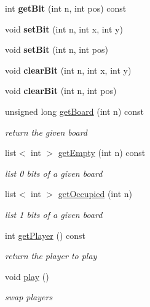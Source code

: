 \begin{DoxyCompactItemize}
\item 
\hypertarget{class_bitboard_a4f966e7856d6ca00e2f3ff9c60b84fa1}{int {\bfseries get\+Bit} (int n, int pos) const }\label{class_bitboard_a4f966e7856d6ca00e2f3ff9c60b84fa1}

\item 
\hypertarget{class_bitboard_ac4e0310c5f4358c6a2324188c331baa6}{void {\bfseries set\+Bit} (int n, int x, int y)}\label{class_bitboard_ac4e0310c5f4358c6a2324188c331baa6}

\item 
\hypertarget{class_bitboard_a719be7dc22698d1d6d9138ac9875328e}{void {\bfseries set\+Bit} (int n, int pos)}\label{class_bitboard_a719be7dc22698d1d6d9138ac9875328e}

\item 
\hypertarget{class_bitboard_a682fc651de10664e2d0c6583609897c1}{void {\bfseries clear\+Bit} (int n, int x, int y)}\label{class_bitboard_a682fc651de10664e2d0c6583609897c1}

\item 
\hypertarget{class_bitboard_a54b8503679ef35d587a6624fd910d934}{void {\bfseries clear\+Bit} (int n, int pos)}\label{class_bitboard_a54b8503679ef35d587a6624fd910d934}

\item 
unsigned long \hyperlink{class_bitboard_a4d75c6baadfb64ab2a0d39d4256ecd81}{get\+Board} (int n) const 
\begin{DoxyCompactList}\small\item\em return the given board \end{DoxyCompactList}\item 
list$<$ int $>$ \hyperlink{class_bitboard_add99aaac08d1926daf8836165cbba82e}{get\+Empty} (int n) const 
\begin{DoxyCompactList}\small\item\em list 0 bits of a given board \end{DoxyCompactList}\item 
list$<$ int $>$ \hyperlink{class_bitboard_af334925201c192ed13760fab4341bceb}{get\+Occupied} (int n)
\begin{DoxyCompactList}\small\item\em list 1 bits of a given board \end{DoxyCompactList}\item 
int \hyperlink{class_bitboard_a93c3e91c8bce5425b171bfd698cad6dd}{get\+Player} () const 
\begin{DoxyCompactList}\small\item\em return the player to play \end{DoxyCompactList}\item 
\hypertarget{class_bitboard_a06f70ece7a8e4e308c7a97136d186f6c}{void \hyperlink{class_bitboard_a06f70ece7a8e4e308c7a97136d186f6c}{play} ()}\label{class_bitboard_a06f70ece7a8e4e308c7a97136d186f6c}

\begin{DoxyCompactList}\small\item\em swap players \end{DoxyCompactList}\end{DoxyCompactItemize}


